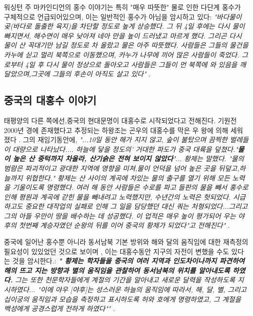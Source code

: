 \documentclass[10pt,twocolumn,letterpaper]{article}
\begin{document}
\begin{개요}
워싱턴 주 마카인디언의 홍수 이야기는 특히 "매우 따뜻한" 물로 인한 다단계 홍수가 구체적으로 언급되어있으며, 이는 일반적인 홍수가 아님을 암시하고 있다: \textit{"바다물이 곶(바다로 돌출한 육지)을 차단할 정도로 높게 상승했다. 그 뒤 4일 후에는 다시 물이 빠지면서, 해수면이 매우 낮아져 네아 만을 높이 드러냈고 마르게 했다. 그리곤 다시  물이 산 꼭대기만 남길 정도로 차 올랐고 물은 아주 따뜻했다. 사람들은 그들의 물건을 카누에 싣고 멀리 북쪽으로 이동했으며,  카누가 나무에 끼어 많은 사람들이 죽었다. 그로부터 4일 후 다시 물이 정상으로 돌아오고 사람들은 그들이 먼 북쪽에 와 있음을 깨달았으며,그곳에 그들의 후손이 아직도 살고 있다"} \cite{3}.

\subsection{중국의 대홍수 이야기}

태평양의 다른 쪽에선,중국의 현대문명이 대홍수로 시작되었다고 전해진다. 기원전 2000년 경에 존재했다고 추정되는 하왕조는 곤우의 대홍수를 막은 우 왕에 의해 세워졌다 \cite{6}. 그의 재임기동안에, \textit{"...10일 동안 해가 지지 않고, 숲이 불탔으며 끔찍한 벌레들이 대량으로 나타났다.... 하늘에 닿을 정도의’ 거대한 파도가 중국 대륙을 덮쳤다."\textbf{물이 높은 산 중턱까지 차올라, 산기슭은 전혀 보이지 않았다'}... 황제는 말했다. "물의 범람은 파괴적이고 광대한 지역에 영향을 미쳐,물이 언덕을 넘어 높은 곳을 뒤덮고,하늘까지 위협한다." 황제는 산 사이의 계곡에 차있는 물의 출구를 열기 위해 모든 노력을 기울이도록 명령했다. 여러 해 동안 사람들은 수로를 파고 들판의 물을 빼서 홍수로 인해 평원과 계곡에 갇힌 물을 빼내려고 노력했지만, 수년간의 노력은 헛되었다. 시급하고도 중요한 대작업의 실패로 인해 그 일을 담당했던 대신 쿼는 처형되었다...그리고 그의 아들 우만이 땅을 배수하는 데 성공했다. 이 업적은 매우 높이 평가되어 우는 야후의 첫번째 계승자였던 순왕의 뒤를 이어 중국의 황제가 되었다"고 전해진다"} \cite{5}.

중국에 일어난 홍수뿐 아니라 동서남북 기본 방위와 해와 달의 움직임에 대한 재측정의 필요성이 있있었던 것으로 보이며 , 이는 대홍수동안 지구의 자전이 변했을 수도 있다는 것을 암시한다.: \textit{\textbf{" 황제는 학자들을 중국의 여러 지역과 인도차이나까지 파견하여 해의 뜨고 지는 방향과 별의 움직임을 관찰하여 동서남북의 위치를 알아내도록 하였다.} 그는 또한 천문학자들에게 계절의 기간을 알아내고 새로운 달력을 작성하도록 지시하였다... "이에 야우 [야후]는 성스러운 하늘의 움직임에 따라서, 해, 달, 별, 그리고 십이궁의 움직임과 모습을 측정하고 표시하도록  허와 호에게 명령하였고, 그 계절을 백성에게 공경스럽게 전하게 하였다""} \cite{5}.


\end{개요}
\end{document}

